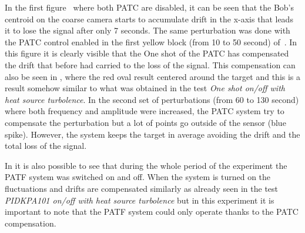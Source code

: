 In the first figure~ where both PATC are disabled, it can be seen that the Bob's centroid on the coarse camera starts to accumulate drift in the x-axis that leads it to lose the signal after only 7 seconds.
The same perturbation was done with the PATC control enabled in the first yellow block (from 10 to 50 second) of~.
In this figure it is clearly visible that the One shot of the PATC has compensated the drift that before had carried to the loss of the signal. This compensation can also be seen in , where the red oval result centered around the target and this is a result somehow similar to what was obtained in the test \textit{One shot on/off with heat source turbolence}.
In the second set of perturbations (from 60 to 130 second) where both frequency and amplitude were increased, the PATC system try to compensate the perturbation but a lot of points go outside of the sensor (blue spike). However, the system keeps the target in average avoiding the drift and the total loss of the signal.

In  it is also possible to see that during the whole period of the experiment the PATF system was switched on and off.
When the system is turned on the fluctuations and drifts are compensated similarly as already seen in the test \textit{PIDKPA101 on/off with heat source turbolence} but in this experiment it is important to note that the PATF system could only operate thanks to the PATC compensation.
